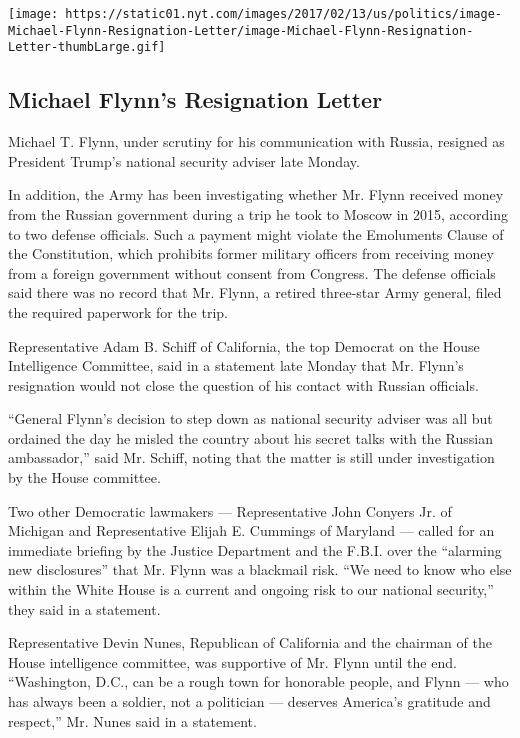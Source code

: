 \texttt{[image: https://static01.nyt.com/images/2017/02/13/us/politics/image-Michael-Flynn-Resignation-Letter/image-Michael-Flynn-Resignation-Letter-thumbLarge.gif]}

\hypertarget{michael-flynns-resignation-letter}{%
\subsection{Michael Flynn's Resignation
Letter}\label{michael-flynns-resignation-letter}}

Michael T. Flynn, under scrutiny for his communication with Russia,
resigned as President Trump's national security adviser late Monday.

In addition, the Army has been investigating whether Mr. Flynn received
money from the Russian government during a trip he took to Moscow in
2015, according to two defense officials. Such a payment might violate
the Emoluments Clause of the Constitution, which prohibits former
military officers from receiving money from a foreign government without
consent from Congress. The defense officials said there was no record
that Mr. Flynn, a retired three-star Army general, filed the required
paperwork for the trip.

Representative Adam B. Schiff of California, the top Democrat on the
House Intelligence Committee, said in a statement late Monday that Mr.
Flynn's resignation would not close the question of his contact with
Russian officials.

``General Flynn's decision to step down as national security adviser was
all but ordained the day he misled the country about his secret talks
with the Russian ambassador,'' said Mr. Schiff, noting that the matter
is still under investigation by the House committee.

Two other Democratic lawmakers --- Representative John Conyers Jr. of
Michigan and Representative Elijah E. Cummings of Maryland --- called
for an immediate briefing by the Justice Department and the F.B.I. over
the ``alarming new disclosures'' that Mr. Flynn was a blackmail risk.
``We need to know who else within the White House is a current and
ongoing risk to our national security,'' they said in a statement.

Representative Devin Nunes, Republican of California and the chairman of
the House intelligence committee, was supportive of Mr. Flynn until the
end. ``Washington, D.C., can be a rough town for honorable people, and
Flynn --- who has always been a soldier, not a politician --- deserves
America's gratitude and respect,'' Mr. Nunes said in a statement.


